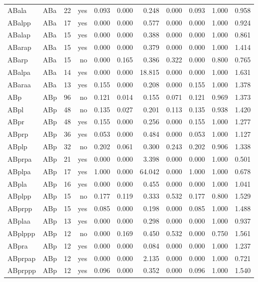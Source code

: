 \documentclass[10pt]{article}
\begin{document}
\begin{table}[p]
{\begin{tabular}{llrrrrrrrrr}
ABala & ABa & 22 & yes & 0.093 & 0.000 & 0.248 & 0.000 & 0.093 & 1.000 & 0.958 \\
ABalpp & ABa & 17 & yes & 0.000 & 0.000 & 0.577 & 0.000 & 0.000 & 1.000 & 0.924 \\
ABalap & ABa & 15 & yes & 0.000 & 0.000 & 0.388 & 0.000 & 0.000 & 1.000 & 0.861 \\
ABarap & ABa & 15 & yes & 0.000 & 0.000 & 0.379 & 0.000 & 0.000 & 1.000 & 1.414 \\
ABarp & ABa & 15 & no & 0.000 & 0.165 & 0.386 & 0.322 & 0.000 & 0.800 & 0.765 \\
ABalpa & ABa & 14 & yes & 0.000 & 0.000 & 18.815 & 0.000 & 0.000 & 1.000 & 1.631 \\
ABaraa & ABa & 13 & yes & 0.155 & 0.000 & 0.208 & 0.000 & 0.155 & 1.000 & 1.378 \\
\midrule
ABp & ABp & 96 & no & 0.121 & 0.014 & 0.155 & 0.071 & 0.121 & 0.969 & 1.373 \\
ABpl & ABp & 48 & no & 0.135 & 0.027 & 0.201 & 0.113 & 0.135 & 0.938 & 1.420 \\
ABpr & ABp & 48 & yes & 0.155 & 0.000 & 0.256 & 0.000 & 0.155 & 1.000 & 1.277 \\
ABprp & ABp & 36 & yes & 0.053 & 0.000 & 0.484 & 0.000 & 0.053 & 1.000 & 1.127 \\
ABplp & ABp & 32 & no & 0.202 & 0.061 & 0.300 & 0.243 & 0.202 & 0.906 & 1.338 \\
ABprpa & ABp & 21 & yes & 0.000 & 0.000 & 3.398 & 0.000 & 0.000 & 1.000 & 0.501 \\
ABplpa & ABp & 17 & yes & 1.000 & 0.000 & 64.042 & 0.000 & 1.000 & 1.000 & 0.678 \\
ABpla & ABp & 16 & yes & 0.000 & 0.000 & 0.455 & 0.000 & 0.000 & 1.000 & 1.041 \\
ABplpp & ABp & 15 & no & 0.177 & 0.119 & 0.333 & 0.532 & 0.177 & 0.800 & 1.529 \\
ABprpp & ABp & 15 & yes & 0.085 & 0.000 & 0.198 & 0.000 & 0.085 & 1.000 & 1.488 \\
ABplaa & ABp & 13 & yes & 0.000 & 0.000 & 0.298 & 0.000 & 0.000 & 1.000 & 0.937 \\
ABplppp & ABp & 12 & no & 0.000 & 0.169 & 0.450 & 0.532 & 0.000 & 0.750 & 1.561 \\
ABpra & ABp & 12 & yes & 0.000 & 0.000 & 0.084 & 0.000 & 0.000 & 1.000 & 1.237 \\
ABprpap & ABp & 12 & yes & 0.000 & 0.000 & 2.135 & 0.000 & 0.000 & 1.000 & 0.721 \\
ABprppp & ABp & 12 & yes & 0.096 & 0.000 & 0.352 & 0.000 & 0.096 & 1.000 & 1.540 \\

\end{tabular}}
\end{table}
\end{document}
